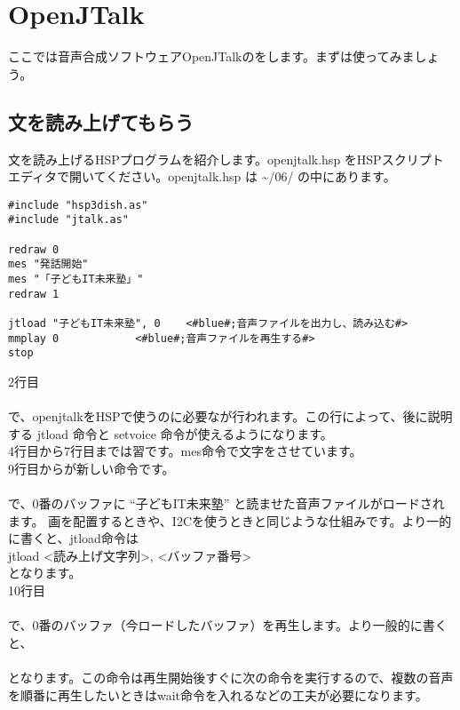 \section{OpenJTalk}
ここでは音声合成ソフトウェアOpenJTalkのをします。まずは使ってみましょう。
\subsection{文を読み上げてもらう}
文を読み上げるHSPプログラムを紹介します。openjtalk.hsp をHSPスクリプトエディタで開いてください。openjtalk.hsp は  \textasciitilde /06/ の中にあります。\\

\begin{lstlisting}[caption=openjtalk.hsp,label=openjtalk.hsp]
#include "hsp3dish.as"
#include "jtalk.as"

redraw 0
mes "発話開始"
mes "「子どもIT未来塾」"
redraw 1

jtload "子どもIT未来塾", 0	<#blue#;音声ファイルを出力し、読み込む#>
mmplay 0			<#blue#;音声ファイルを再生する#>
stop
\end{lstlisting}

2行目\\
\\
で、openjtalkをHSPで使うのに必要なが行われます。この行によって、後に説明する jtload 命令と setvoice 命令が使えるようになります。\\
4行目から7行目までは習です。mes命令で文字をさせています。\\
9行目からが新しい命令です。\\
\\
で、0番のバッファに “子どもIT未来塾” と読ませた音声ファイルがロードされます。 画を配置するときや、I2Cを使うときと同じような仕組みです。より一的に書くと、jtload命令は\\
jtload <読み上げ文字列>, <バッファ番号>\\
となります。\\
10行目\\
\\
で、0番のバッファ（今ロードしたバッファ）を再生します。より一般的に書くと、\\
\\
となります。この命令は再生開始後すぐに次の命令を実行するので、複数の音声を順番に再生したいときはwait命令を入れるなどの工夫が必要になります。\\

\begin{tcolorbox}[title=\useOmetoi]
\begin{enumerate}
\end{enumerate}
\end{tcolorbox}
